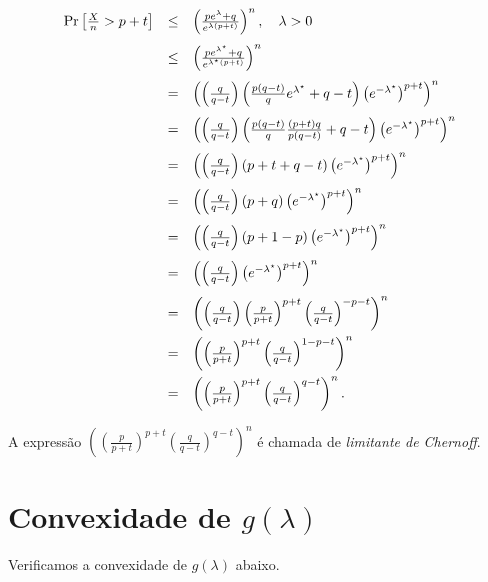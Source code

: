 \documentclass{article}
\begin{document}
\begin{equation}\notag
    \begin{array}{rcl}
        \Pr\left[\frac{X}{n} > p + t \right] 
          & \leq & \left(\frac{pe^\lambda+q}{e^{\lambda(p+t)}}\right)^n,\quad \lambda > 0 \\[1em]
          & \leq & \left(\frac{pe^{\lambda^\star}+q}{e^{\lambda^\star(p+t)}}\right)^n\\[1em]
          & = & \left(\left(\frac{q}{q-t}\right)\left(\frac{p(q-t)}{q}e^{\lambda^\star}+q-t\right)\left(e^{-\lambda^\star}\right)^{p+t}\right)^n\\[1em]
          & = & \left(\left(\frac{q}{q-t}\right)\left(\frac{p(q-t)}{q}\frac{(p+t)q}{p(q-t)}+q-t\right)\left(e^{-\lambda^\star}\right)^{p+t}\right)^n\\[1em]
          & = & \left(\left(\frac{q}{q-t}\right)\left(p+t+q-t\right)\left(e^{-\lambda^\star}\right)^{p+t}\right)^n\\[1em]
          & = & \left(\left(\frac{q}{q-t}\right)\left(p+q\right)\left(e^{-\lambda^\star}\right)^{p+t}\right)^n\\[1em]
          & = & \left(\left(\frac{q}{q-t}\right)\left(p+1-p\right)\left(e^{-\lambda^\star}\right)^{p+t}\right)^n\\[1em]
          & = & \left(\left(\frac{q}{q-t}\right)\left(e^{-\lambda^\star}\right)^{p+t}\right)^n\\[1em]
          & = & \left(\left(\frac{q}{q-t}\right)\left(\frac{p}{p+t}\right)^{p+t}\left(\frac{q}{q-t}\right)^{-p-t}\right)^n\\[1em]
          & = & \left(\left(\frac{p}{p+t}\right)^{p+t}\left(\frac{q}{q-t}\right)^{1-p-t}\right)^n\\[1em]
          & = & \left(\left(\frac{p}{p+t}\right)^{p+t}\left(\frac{q}{q-t}\right)^{q-t}\right)^n.
    \end{array}
\end{equation}

A expressão \(\left(\left(\frac{p}{p+t}\right)^{p+t}\left(\frac{q}{q-t}\right)^{q-t}\right)^n\) é chamada de \emph{limitante de Chernoff}.

\newpage

\section*{Convexidade de \(g(\lambda)\)}

Verificamos a convexidade de \(g(\lambda)\) abaixo.
\end{document}
